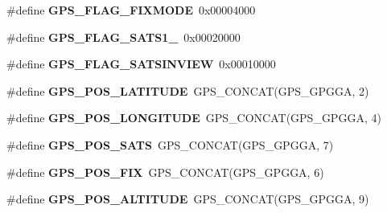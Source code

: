 \begin{DoxyCompactItemize}
\item 
\hypertarget{group___t_m___g_p_s___macros_gaad3fa0dd675da8d7a36a64301b69607e}{}\#define {\bfseries G\+P\+S\+\_\+\+F\+L\+A\+G\+\_\+\+F\+I\+X\+M\+O\+D\+E}~0x00004000\label{group___t_m___g_p_s___macros_gaad3fa0dd675da8d7a36a64301b69607e}

\item 
\hypertarget{group___t_m___g_p_s___macros_gaabcdeb4349b9c23c5ccb03698160845f}{}\#define {\bfseries G\+P\+S\+\_\+\+F\+L\+A\+G\+\_\+\+S\+A\+T\+S1\+\_}~0x00020000\label{group___t_m___g_p_s___macros_gaabcdeb4349b9c23c5ccb03698160845f}

\item 
\hypertarget{group___t_m___g_p_s___macros_ga5f44dcc5737306b8a559215c91a73a29}{}\#define {\bfseries G\+P\+S\+\_\+\+F\+L\+A\+G\+\_\+\+S\+A\+T\+S\+I\+N\+V\+I\+E\+W}~0x00010000\label{group___t_m___g_p_s___macros_ga5f44dcc5737306b8a559215c91a73a29}

\item 
\hypertarget{group___t_m___g_p_s___macros_gaf34bae4a76126c8f11084be24791f0f9}{}\#define {\bfseries G\+P\+S\+\_\+\+P\+O\+S\+\_\+\+L\+A\+T\+I\+T\+U\+D\+E}~G\+P\+S\+\_\+\+C\+O\+N\+C\+A\+T(G\+P\+S\+\_\+\+G\+P\+G\+G\+A, 2)\label{group___t_m___g_p_s___macros_gaf34bae4a76126c8f11084be24791f0f9}

\item 
\hypertarget{group___t_m___g_p_s___macros_gaa234c253bf4abd5b2339d0df385c5503}{}\#define {\bfseries G\+P\+S\+\_\+\+P\+O\+S\+\_\+\+L\+O\+N\+G\+I\+T\+U\+D\+E}~G\+P\+S\+\_\+\+C\+O\+N\+C\+A\+T(G\+P\+S\+\_\+\+G\+P\+G\+G\+A, 4)\label{group___t_m___g_p_s___macros_gaa234c253bf4abd5b2339d0df385c5503}

\item 
\hypertarget{group___t_m___g_p_s___macros_ga6574440fb481eec75f24a39af635b2cf}{}\#define {\bfseries G\+P\+S\+\_\+\+P\+O\+S\+\_\+\+S\+A\+T\+S}~G\+P\+S\+\_\+\+C\+O\+N\+C\+A\+T(G\+P\+S\+\_\+\+G\+P\+G\+G\+A, 7)\label{group___t_m___g_p_s___macros_ga6574440fb481eec75f24a39af635b2cf}

\item 
\hypertarget{group___t_m___g_p_s___macros_gac7ab6ca762b8f54e9ac13e853a17140b}{}\#define {\bfseries G\+P\+S\+\_\+\+P\+O\+S\+\_\+\+F\+I\+X}~G\+P\+S\+\_\+\+C\+O\+N\+C\+A\+T(G\+P\+S\+\_\+\+G\+P\+G\+G\+A, 6)\label{group___t_m___g_p_s___macros_gac7ab6ca762b8f54e9ac13e853a17140b}

\item 
\hypertarget{group___t_m___g_p_s___macros_ga20c8a52e80e930782d6f59172541ca45}{}\#define {\bfseries G\+P\+S\+\_\+\+P\+O\+S\+\_\+\+A\+L\+T\+I\+T\+U\+D\+E}~G\+P\+S\+\_\+\+C\+O\+N\+C\+A\+T(G\+P\+S\+\_\+\+G\+P\+G\+G\+A, 9)\label{group___t_m___g_p_s___macros_ga20c8a52e80e930782d6f59172541ca45}


\end{DoxyCompactItemize}
